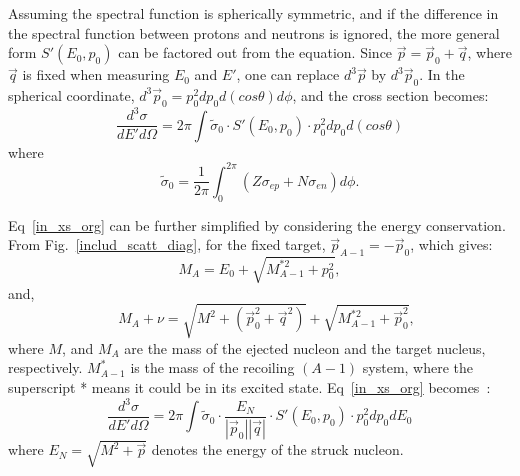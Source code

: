 Assuming the spectral function is spherically symmetric, and if the difference in the spectral function between protons and neutrons is ignored, the more general form $S'(E_{0},p_{0})$ can be factored out from the equation. Since $\vec{p} = \vec{p}_{0}+\vec{q}$, where $\vec{q}$ is fixed when measuring $E_{0}$ and $E'$, one can replace $d^{3}\vec{p}$ by $d^{3}\vec{p}_{0}$. In the spherical coordinate, $d^{3}\vec{p}_{0}=p_{0}^{2} dp_{0}d(cos\theta) d\phi$, and the cross section becomes:
\begin{equation}
  \frac{d^{3}\sigma}{dE'd\Omega} = 2\pi \int \tilde{\sigma}_{0}\cdot S'(E_{0},p_{0})\cdot p_{0}^{2}dp_{0}d(cos\theta)
  \label{in_xs_org}
\end{equation}
where
\begin{equation}
  \tilde{\sigma}_{0} = \frac{1}{2\pi}\int_{0}^{2\pi} \left( Z\sigma_{ep}+N\sigma_{en} \right)d\phi.
\end{equation}

Eq~\eqref{in_xs_org} can be further simplified by considering the energy conservation. From Fig.~\ref{includ_scatt_diag}, for the fixed target, $\vec{p}_{A-1} = - \vec{p}_{0}$, which gives: 
\begin{equation}
  M_{A}= E_{0}+ \sqrt{M_{A-1}^{*2}+p_{0}^{2}},
\end{equation}
and,
\begin{equation}
  \quad  M_{A}+\nu = \sqrt{M^{2}+(\vec{p}_{0}^{2}+\vec{q}^{2})}+\sqrt{M_{A-1}^{*2}+\vec{p}_{0}^{2}},
  \label{ene_mom_cons}
\end{equation}
where $M$, and $M_{A}$ are the mass of the ejected nucleon and the target nucleus, respectively. $M_{A-1}^{*}$ is the mass of the recoiling $(A-1)$ system, where the superscript * means it could be in its excited state. Eq~\ref{in_xs_org} becomes~\cite{john_thesis}:
\begin{equation}
  \frac{d^{3}\sigma}{dE'd\Omega} = 2\pi \int \tilde{\sigma}_{0}\cdot \frac{E_{N}}{|\vec{p}_{0}||\vec{q}|} \cdot S'(E_{0},p_{0})\cdot p_{0}^{2}dp_{0}dE_{0}
\end{equation}
where $E_{N}=\sqrt{M^{2}+\vec{p}}$ denotes the energy of the struck nucleon.

